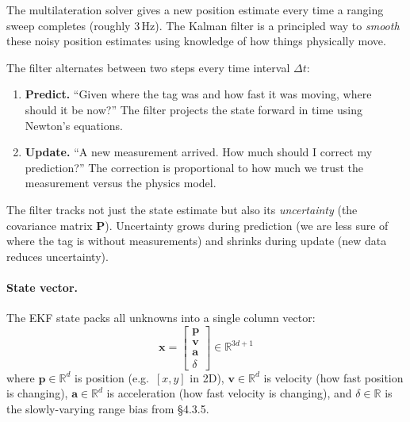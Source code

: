 \documentclass[11pt,a4paper]{article}
\newcommand{\vect}[1]{\bm{#1}}
\newcommand{\mat}[1]{\mathbf{#1}}
\begin{document}
\begin{intubox}
The multilateration solver gives a new position estimate every time a ranging sweep completes (roughly 3\,Hz). The Kalman filter is a principled way to \emph{smooth} these noisy position estimates using knowledge of how things physically move.

The filter alternates between two steps every time interval $\Delta t$:
\begin{enumerate}[leftmargin=2em, topsep=2pt]
  \item \textbf{Predict.} ``Given where the tag was and how fast it was moving, where should it be now?'' The filter projects the state forward in time using Newton's equations.
  \item \textbf{Update.} ``A new measurement arrived. How much should I correct my prediction?'' The correction is proportional to how much we trust the measurement versus the physics model.
\end{enumerate}
The filter tracks not just the state estimate but also its \emph{uncertainty} (the covariance matrix $\mat{P}$). Uncertainty grows during prediction (we are less sure of where the tag is without measurements) and shrinks during update (new data reduces uncertainty).
\end{intubox}

\paragraph{State vector.} The EKF state packs all unknowns into a single column vector:
\begin{equation}
\vect{x} = \begin{bmatrix} \vect{p} \\ \vect{v} \\ \vect{a} \\ \delta \end{bmatrix} \in \mathbb{R}^{3d+1}
\end{equation}
where $\vect{p} \in \mathbb{R}^d$ is position (e.g.\ $[x,y]$ in 2D), $\vect{v} \in \mathbb{R}^d$ is velocity (how fast position is changing), $\vect{a} \in \mathbb{R}^d$ is acceleration (how fast velocity is changing), and $\delta \in \mathbb{R}$ is the slowly-varying range bias from \S4.3.5.
\end{document}
